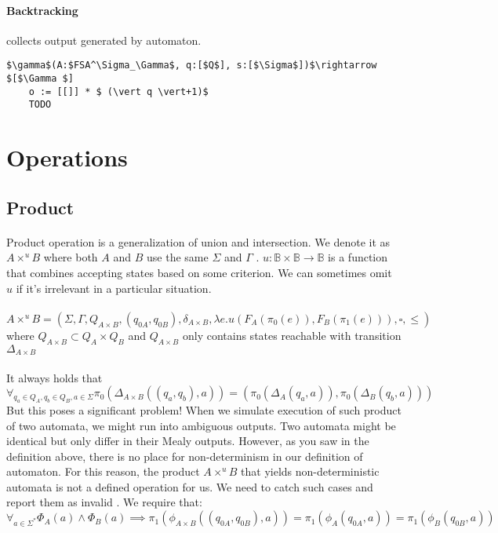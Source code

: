 \documentclass[12pt]{article}
\begin{document}
\paragraph{Backtracking} collects output generated by automaton.

\begin{lstlisting}
$\gamma$(A:$FSA^\Sigma_\Gamma$, q:[$Q$], s:[$\Sigma$])$\rightarrow $[$\Gamma $]
    o := [[]] * $ (\vert q \vert+1)$
    TODO
\end{lstlisting}


\section{Operations }

\subsection{Product}

\paragraph{}
Product operation is a generalization of union and intersection. We denote it as 
$A \times^u B$ where both $A$ and $B$ use the same $\Sigma$ and $ \Gamma$ . $u:\mathbb{B} \times \mathbb{B} \rightarrow \mathbb{B}$ is a function that combines accepting states based on some criterion. We can sometimes omit $u$ if it's irrelevant in a particular situation. \\
\\
$A\times^u B = (\Sigma , \Gamma , Q_{A \times B}, (q_{0A},q_{0B}) , \delta_{A\times B},   \lambda e.u(F_A(\pi_0(e)), F_B(\pi_1(e))) , \square , \le)$ where $Q_{A \times B} \subset  Q_A \times Q_B$ and  $Q_{A \times B}$ only contains states reachable with transition $\Delta_{A\times B}$\\
\\
It always holds that\\
$\forall_{q_a \in Q_A,q_b \in Q_B,a \in \Sigma} \pi_0(\Delta_{A\times B} ((q_a,q_b),a)) = (\pi_0(\Delta_A (q_a,a)) ,\pi_0(\Delta_B (q_b,a)))$ \\

But this poses a significant problem! When we simulate execution of such product of two automata, we might run into ambiguous outputs. Two automata might be identical but only differ in their Mealy outputs. However, as you saw in the definition above, there is no place for non-determinism in our definition of automaton. For this reason, the product $A \times^u B$ that yields non-deterministic automata is not a defined operation for us. We need to catch such cases and report them as invalid . We require that: \\
$\forall_{a \in \Sigma^*} \Phi_A (a) \wedge \Phi_B (a) \implies \pi_1(\phi_{A\times B} ((q_{0A},q_{0B}),a)) = \pi_1(\phi_A (q_{0A},a)) = \pi_1(\phi_B (q_{0B},a))$ \\
\end{document}
